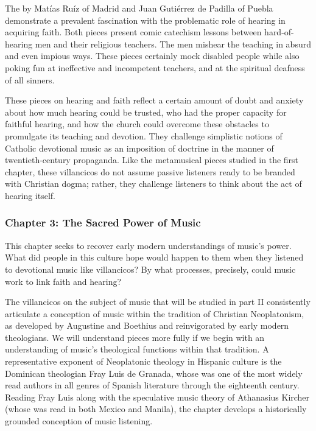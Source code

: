 \documentclass{vcbook-proposal}
\begin{document}
The  by Matías Ruíz of Madrid and Juan Gutiérrez de Padilla of Puebla demonstrate a prevalent fascination with the problematic role of hearing in acquiring faith.
Both pieces present comic catechism lessons between hard-of-hearing men and their religious teachers.
The  men mishear the teaching in absurd and even impious ways.
These pieces certainly mock disabled people while also poking fun at ineffective and incompetent teachers, and at the spiritual deafness of all sinners.

These pieces on hearing and faith reflect a certain amount of doubt and anxiety about how much hearing could be trusted, who had the proper capacity for faithful hearing, and how the church could overcome these obstacles to promulgate its teaching and devotion.
They challenge simplistic notions of Catholic devotional music as an imposition of doctrine in the manner of twentieth-century propaganda. 
Like the metamusical pieces studied in the first chapter, these villancicos do not assume passive listeners ready to be branded with Christian dogma; rather, they challenge listeners to think about the act of hearing itself.


\subsubsection{Chapter 3: The Sacred Power of Music}

This chapter seeks to recover early modern understandings of music's power.
What did people in this culture hope would happen to them when they listened to devotional music like villancicos?
By what processes, precisely, could music work to link faith and hearing?

The villancicos on the subject of music that will be studied in part II consistently articulate a conception of music within the tradition of Christian Neoplatonism, as developed by Augustine and Boethius and reinvigorated by early modern theologians.
We will understand pieces more fully if we begin with an understanding of music's theological functions within that tradition.
A representative exponent of Neoplatonic theology in Hispanic culture is the Dominican theologian Fray Luis de Granada, whose was one of the most widely read authors in all genres of Spanish literature through the eighteenth century.
Reading Fray Luis along with the speculative music theory of Athanasius Kircher (whose  was read in both Mexico and Manila), the chapter develops a historically grounded conception of music listening.
\end{document}
